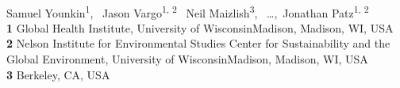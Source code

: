\documentclass[10pt,letterpaper]{article}\usepackage[]{graphicx}\usepackage[]{color}
\date{}
\begin{document}
\vspace*{0.2in}

\begin{flushleft}
{\Large
\textbf{} %
}
\newline
\\
Samuel Younkin\textsuperscript{1},\ %
Jason Vargo\textsuperscript{1, 2}\ %
Neil Maizlish\textsuperscript{3},\ %
\ldots,\
Jonathan Patz\textsuperscript{1, 2}%
\\
\bigskip
\textbf{1} Global Health Institute, University of Wisconsin{\textendash}Madison, Madison, WI, USA
\\
\textbf{2} Nelson Institute for Environmental Studies Center for Sustainability and the Global Environment, University of Wisconsin{\textendash}Madison, Madison, WI, USA
\\
\textbf{3} Berkeley, CA, USA
\\
\bigskip

%
%




\end{flushleft}
\end{document}
